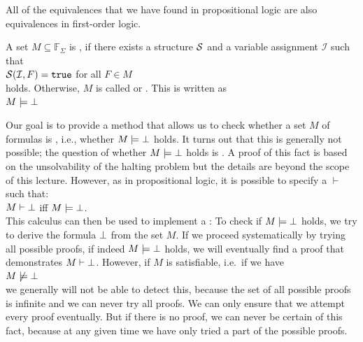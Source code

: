 \remarkEng
All of the equivalences that we have found in propositional logic are also equivalences in first-order logic.
\eox

\begin{Definition}[Satisfiable]
    A set $M \subseteq \mathbb{F}_\Sigma$ is ,
    if there exists a structure $\mathcal{S}$ and a variable assignment $\mathcal{I}$ such that 
    \\[0.2cm]
    \hspace*{1.3cm}
    $\mathcal{S}(\mathcal{I},F) = \mathtt{true}$ \quad for all $F \in M$ 
    \\[0.2cm]
    holds. Otherwise, $M$ is called  or .
    This is written as \\[0.2cm]
    \hspace*{1.3cm} $M \models \bot$ 
    \eox
\end{Definition}

\noindent
Our goal is to provide a method that allows us to check
whether a set $M$ of formulas is , i.e., whether 
$M \models \bot$ holds. It turns out that this is generally not
possible; the question of whether $M \models \bot$ holds is . A proof
of this fact is based on the unsolvability of the halting problem but the details are beyond the scope of
this lecture. 
However, as in propositional logic, it is possible
to specify a  $\vdash$ such that: \\[0.2cm]
\hspace*{1.3cm} $M \vdash \bot$ \quad iff \quad $M \models \bot$. \\[0.2cm]
This calculus can then be used to implement a
: To check if
$M \models \bot$ holds, we try to derive the formula $\bot$
from the set $M$.
If we proceed systematically by trying all possible proofs,
if indeed $M \models \bot$ holds, we will eventually find a proof
that demonstrates $M \vdash \bot$. However, if $M$ is satisfiable, i.e.~if we have  \\[0.2cm]
\hspace*{1.3cm}  $M \not\models \bot$ \\[0.2cm]
we generally will not be able to detect this, because the set of all possible proofs is infinite
and we can never try all proofs. We can only ensure that
we attempt every proof eventually. But if there is no proof, we can
never be certain of this fact, because at any given time we have only tried a part of the
possible proofs.

